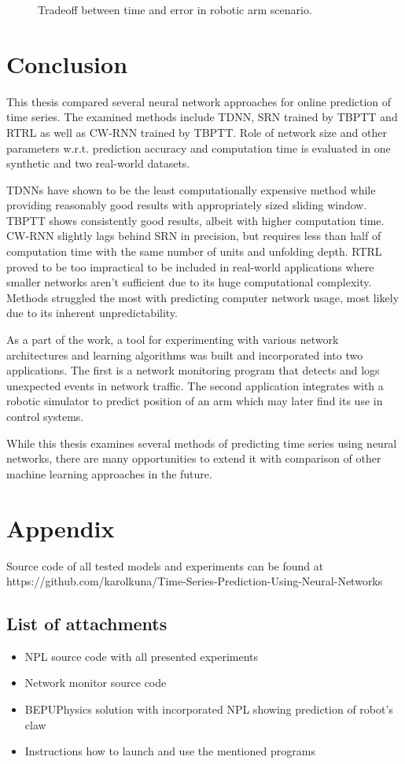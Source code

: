 \documentclass[12pt,oneside]{fithesis2}
\begin{document}
	\begin{figure}[H]
		\caption{Tradeoff between time and error in robotic arm scenario.}
		
	\end{figure}

\chapter{Conclusion}
This thesis compared several neural network approaches for online prediction of time series. The examined methods include TDNN, SRN trained by TBPTT and RTRL as well as CW-RNN trained by TBPTT. Role of network size and other parameters w.r.t. prediction accuracy and computation time is evaluated in one synthetic and two real-world datasets. \par
TDNNs have shown to be the least computationally expensive method while providing reasonably good results with appropriately sized sliding window. TBPTT shows consistently good results, albeit with higher computation time. CW-RNN slightly lags behind SRN in precision, but requires less than half of computation time with the same number of units and unfolding depth. RTRL proved to be too impractical to be included in real-world applications where smaller networks aren't sufficient due to its huge computational complexity. Methods struggled the most with predicting computer network usage, most likely due to its inherent unpredictability.\par
As a part of the work, a tool for experimenting with various network architectures and learning algorithms was built and incorporated into two applications. The first is a network monitoring program that detects and logs unexpected events in network traffic. The second application integrates with a robotic simulator to predict position of an arm which may later find its use in control systems.\par
While this thesis examines several methods of predicting time series using neural networks, there are many opportunities to extend it with comparison of other machine learning approaches in the future.


    \appendix
    \chapter{Appendix}
    Source code of all tested models and experiments can be found at https://github.com/karolkuna/Time-Series-Prediction-Using-Neural-Networks\par
    \section{List of attachments}
    \begin{itemize}
    	\item NPL source code with all presented experiments
	\item Network monitor source code
	\item BEPUPhysics solution with incorporated NPL showing prediction of robot's claw
	\item Instructions how to launch and use the mentioned programs
    \end{itemize}
    
	
	
    
\end{document}
